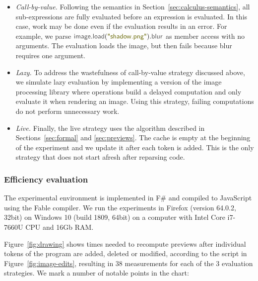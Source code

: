 \documentclass[acmsmall,anonymous,fleqn]{acmart}\settopmatter{printfolios=false,printccs=false,printacmref=false}
\theoremstyle{plain}
\theoremstyle{definition}
\newcommand{\str}[1]{\textnormal{\textcolor{strclr}{\sffamily "#1"}}}
\newcommand{\ident}[1]{\textnormal{\textcolor{idclr}{\sffamily #1}}}
\begin{document}
\begin{itemize}[itemsep=3pt]
\item \emph{Call-by-value.} Following the semantics in Section~\ref{sec:calculus-semantics},
  all sub-expressions are fully evaluated before an expression is evaluated. In this case, work may
  be done even if the evaluation results in an error. For example, we parse
  $\ident{image}.\ident{load}(\str{shadow.png}).\ident{blur}$ as member access with no arguments.
  The evaluation loads the image, but then fails because blur requires one argument.

\item \emph{Lazy.} To address the wastefulness of call-by-value strategy discussed above, we
  simulate lazy evaluation by implementing a version of the image processing library where
  operations build a delayed computation and only evaluate it when rendering an image. Using
  this strategy, failing computations do not perform unnecessary work.

\item \emph{Live.} Finally, the live strategy uses the algorithm described in
  Sections~\ref{sec:formal} and \ref{sec:previews}. The cache is empty at the beginning of the
  experiment and we update it after each token is added. This is the only strategy that does
  not start afresh after reparsing code.
\end{itemize}

\subsubsection{Efficiency evaluation}
The experimental environment is implemented in F\# and compiled to JavaScript using the Fable
compiler. We run the experiments in Firefox (version 64.0.2, 32bit) on Windows 10
(build 1809, 64bit) on a computer with Intel Core i7-7660U CPU and 16Gb RAM.

Figure~\ref{fig:drawing} shows times needed to recompute previews after individual tokens
of the program are added, deleted or modified, according to the script in
Figure~\ref{fig:image-edits}, resulting in 38 measurements for each of the 3
evaluation strategies. We mark a number of notable points in the chart:
\end{document}
